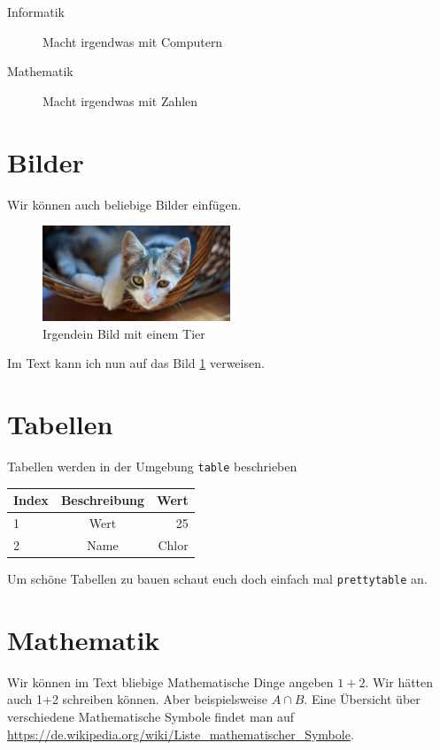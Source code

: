 \documentclass[fontsize=11]{scrartcl}
\begin{document}
	\begin{description}
		\item[Informatik] Macht irgendwas mit Computern
		\item[Mathematik] Macht irgendwas mit Zahlen
	\end{description}

	\section{Bilder}
	Wir können auch beliebige Bilder einfügen.
	\begin{figure}[htb]
		\centering
		\includegraphics[width=0.5\textwidth]{bild.jpg}
		\caption{Irgendein Bild mit einem Tier}
		\label{img:bild}
	\end{figure}
	Im Text kann ich nun auf das Bild \ref{img:bild} verweisen.
	
	\section{Tabellen}
	Tabellen werden in der Umgebung \texttt{table} beschrieben
	\begin{table}[htb]
		\begin{tabular}{l | c r}
			\hline
			Index & Beschreibung & Wert \\
			\hline
			\hline
			1 & Wert & 25 \\
			2 & Name & Chlor \\
		\end{tabular}
	\end{table}
	Um schöne Tabellen zu bauen schaut euch doch einfach mal \texttt{prettytable} an.
	
	\section{Mathematik}
	Wir können im Text bliebige Mathematische Dinge angeben $1+2$. Wir hätten auch 1+2 schreiben können. Aber beispielsweise $A\cap B$. Eine Übersicht über verschiedene Mathematische Symbole findet man auf \url{https://de.wikipedia.org/wiki/Liste_mathematischer_Symbole}.
	
\end{document}
